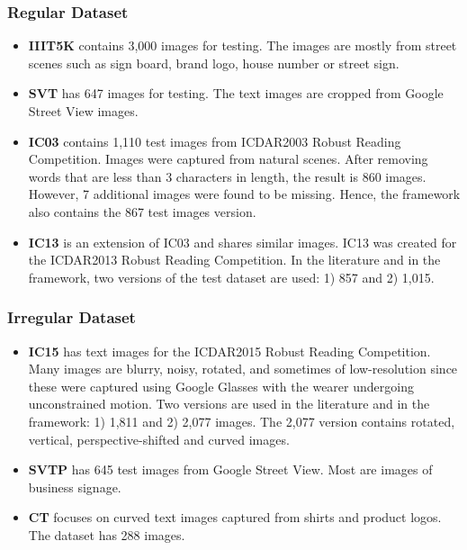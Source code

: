\documentclass[runningheads]{llncs}
\begin{document}
\subsubsection{Regular Dataset}
\begin{itemize}
  \item \textbf{IIIT5K} contains 3,000 images for testing. The images are mostly from street scenes such as sign board, brand logo, house number or street sign. 

  \item \textbf{SVT} has 647 images for testing. The text images are cropped from Google Street View images.
  
  \item \textbf{IC03} contains 1,110 test images from ICDAR2003 Robust Reading Competition. Images were captured from natural scenes. After removing words that are less than 3 characters in length, the result is 860 images. However, 7 additional images were found to be missing. Hence, the framework also contains the 867 test images version. 
  
  \item \textbf{IC13} is an extension of IC03 and shares similar images. IC13 was created for the ICDAR2013 Robust Reading Competition.  In the literature and in the framework, two versions of the test dataset are used: 1) 857 and 2) 1,015.
\end{itemize}

\subsubsection{Irregular Dataset}

\begin{itemize}
    \item \textbf{IC15} has text images for the ICDAR2015 Robust Reading Competition. Many images are blurry, noisy, rotated, and sometimes of low-resolution since these were captured using Google Glasses with the wearer undergoing unconstrained motion. Two versions are used in the literature and in the framework: 1) 1,811 and 2) 2,077 images. The 2,077 version contains rotated, vertical, perspective-shifted and curved images. 
    \item \textbf{SVTP} has 645 test images from Google Street View. Most are images of business signage.
    
    \item \textbf{CT} focuses on curved text images captured from shirts and product logos. The dataset has 288 images. 
\end{itemize}
\end{document}

